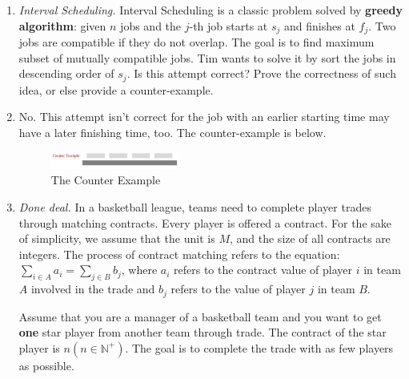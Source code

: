 \documentclass[12pt,a4paper]{article}
\makeatletter
\newtheorem*{solution}{Solution}
\theoremstyle{definition}
\renewenvironment{solution}[1][Solution] {\par\pushQED{\qed}\normalfont\topsep6\p@\@plus6\p@\relax\trivlist\item[\hskip\labelsep\bfseries#1\@addpunct{.}]\ignorespaces}{\popQED\endtrivlist\@endpefalse} \makeatother
\makeatother
\begin{document}
\begin{enumerate}
	\item \textit{Interval Scheduling.} Interval Scheduling is a classic problem solved by \textbf{greedy algorithm}: given $n$ jobs and the $j$-th job starts at $s_j$ and finishes at $f_j$. Two jobs are compatible if they do not overlap. The goal is to find maximum subset of mutually compatible jobs. Tim wants to solve it by sort the jobs in descending order of $s_j$. Is this attempt correct? Prove the correctness of such idea, or else provide a counter-example.
	    \begin{solution}
	        No. This attempt isn't correct for the job with an earlier starting time may have a later finishing time, too. The counter-example is below.
			\begin{figure}[htbp]
                \centering
                \includegraphics[width=0.4\textwidth]{counter-example.pdf}
                \caption{The Counter Example}\label{counter-example}
            \end{figure}
	    \end{solution}
	
	\item \textit{Done deal.} In a basketball league, teams need to complete player trades through matching contracts. Every player is offered a contract. For the sake of simplicity, we assume that the unit is $ M $, and the size of all contracts are integers. The process of contract matching refers to the equation: $ \sum_{i\in A} a_{i}=\sum_{j\in B} b_{j} $, where $ a_{i} $ refers to the contract value of player $ i $ in team $A$ involved in the trade and $ b_{j} $ refers to the value of player $ j $ in team $B$. 
	
	Assume that you are a manager of a basketball team and you want to get \textbf{one} star player from another team through trade. The contract of the star player is $ n (n\in \mathbb{N}^+) $. The goal is to complete the trade with as few players as possible. 
	

\end{enumerate}
\end{document}

